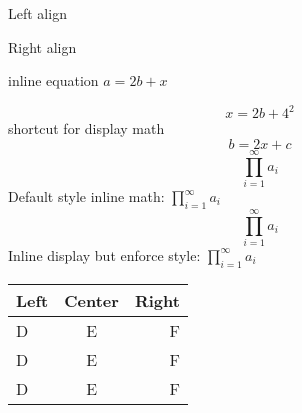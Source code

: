 \documentclass{article}
\begin{document}
	\begin{flushleft}
		Left align
	\end{flushleft}
	
	\begin{flushright}
		Right align
	\end{flushright}

	inline equation $a=2b+x$

	\begin{displaymath}
		x=2b+4^2
	\end{displaymath}
	shortcut for display math $$b=2x+c$$
	\begin{displaymath}		
		\prod_{i=1}^{\infty} a_{i}
	\end{displaymath}
	Default style inline math: $\prod_{i=1}^{\infty} a_{i}$
	$$	\prod_{i=1}^{\infty} a_{i} $$
	Inline display but enforce style: ${\displaystyle \prod_{i=1}^{\infty} a_{i}}$
	
	\begin{tabular}{|lc|r|}
		\hline
		Left & Center & Right \tabularnewline
		\hline
		\hline
		D & E & F \tabularnewline
		\hline
		D & E & F \tabularnewline
		D & E & F \tabularnewline
		\hline
		
	\end{tabular}
	
\end{document}
